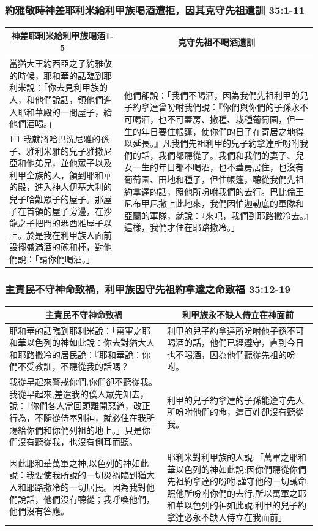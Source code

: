 \subsubsection{約雅敬時神差耶利米給利甲族喝酒遭拒，因其克守先祖遺訓 35:1-11}
\begin{table}[H]
\centering
\begin{tabular}{p{7.75cm}|p{9.50cm}}\hline\hline
\multicolumn{1}{c|}{神差耶利米給利甲族喝酒1-5}&\multicolumn{1}{c}{克守先祖不喝酒遺訓}\\\hline
當猶大王約西亞之子約雅敬的時候，耶和華的話臨到耶利米說：「你去見利甲族的人，和他們說話，領他們進入耶和華殿的一間屋子，給他們酒喝。」
&\multirow{2}{9.7cm}{他們卻說：「我們不喝酒，因為我們先祖利甲的兒子約拿達曾吩咐我們說：『你們與你們的子孫永不可喝酒，也不可蓋房、撒種、栽種葡萄園，但一生的年日要住帳篷，使你們的日子在寄居之地得以延長。』凡我們先祖利甲的兒子約拿達所吩咐我們的話，我們都聽從了。我們和我們的妻子、兒女一生的年日都不喝酒，也不蓋房居住，也沒有葡萄園、田地和種子，但住帳篷，聽從我們先祖約拿達的話，照他所吩咐我們的去行。巴比倫王尼布甲尼撒上此地來，我們因怕迦勒底的軍隊和亞蘭的軍隊，就說：『來吧，我們到耶路撒冷去。』這樣，我們才住在耶路撒冷。」}\\\cline{1-1}
我就將哈巴洗尼雅的孫子、雅利米雅的兒子雅撒尼亞和他弟兄，並他眾子以及利甲全族的人，領到耶和華的殿，進入神人伊基大利的兒子哈難眾子的屋子。那屋子在首領的屋子旁邊，在沙龍之子把門的瑪西雅屋子以上。於是我在利甲族人面前設擺盛滿酒的碗和杯，對他們說：「請你們喝酒。」&\\\hline
\end{tabular}
\end{table}

\subsubsection{主責民不守神命致禍，利甲族因守先祖約拿達之命致福 35:12-19}
\begin{table}[H]
\centering
\begin{tabular}{p{9cm}|p{8.5cm}}\hline\hline
\multicolumn{1}{c|}{主責民不守神命致禍}&\multicolumn{1}{c}{利甲族永不缺人侍立在神面前}\\\hline
耶和華的話臨到耶利米說：「萬軍之耶和華以色列的神如此說：你去對猶大人和耶路撒冷的居民說：『耶和華說：你們不受教訓，不聽從我的話嗎？&利甲的兒子約拿達所吩咐他子孫不可喝酒的話，他們已經遵守，直到今日也不喝酒，因為他們聽從先祖的吩咐。\\\hline
我從早起來警戒你們,你們卻不聽從我。我從早起來,差遣我的僕人眾先知去，說：「你們各人當回頭離開惡道，改正行為，不隨從侍奉別神，就必住在我所賜給你們和你們列祖的地上。」只是你們沒有聽從我，也沒有側耳而聽。&利甲的兒子約拿達的子孫能遵守先人所吩咐他們的命，這百姓卻沒有聽從我。\\\hline
因此耶和華萬軍之神,以色列的神如此說：我要使我所說的一切災禍臨到猶大人和耶路撒冷的一切居民。因為我對他們說話，他們沒有聽從；我呼喚他們，他們沒有答應。
&耶利米對利甲族的人說:「萬軍之耶和華以色列的神如此說:因你們聽從你們先祖約拿達的吩咐,謹守他的一切誡命,照他所吩咐你們的去行,所以萬軍之耶和華以色列的神如此說:利甲的兒子約拿達必永不缺人侍立在我面前」\\\hline
\end{tabular}
\end{table}


